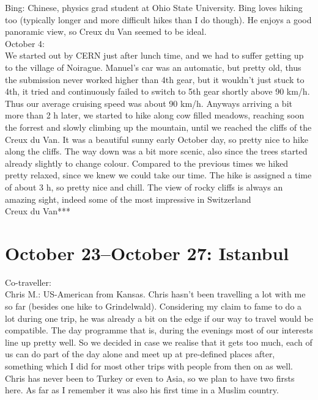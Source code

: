 Bing: Chinese, physics grad student at Ohio State University. Bing loves hiking too (typically longer and more difficult hikes than I do though). He enjoys a good panoramic view, so Creux du Van seemed to be ideal.\\

October 4:\\
We started out by CERN just after lunch time, and we had to suffer getting up to the village of Noirague. Manuel's car was an automatic, but pretty old, thus the submission never worked higher than 4th gear, but it wouldn't just stuck to 4th, it tried and continuously failed to switch to 5th gear shortly above 90 km/h. Thus our average cruising speed was about 90 km/h. Anyways arriving a bit more than 2 h later, we started to hike along cow filled meadows, reaching soon the forrest and slowly climbing up the mountain, until we reached the cliffs of the Creux du Van. It was a beautiful sunny early October day, so pretty nice to hike along the cliffs. The way down was a bit more scenic, also since the trees started already slightly to change colour. Compared to the previous times we hiked pretty relaxed, since we knew we could take our time. The hike is assigned a time of about 3 h, so pretty nice and chill. The view of rocky cliffs is always an amazing sight, indeed some of the most impressive in Switzerland\\

Creux du Van***

\section{October 23--October 27: Istanbul}
\label{Istanbul2014}

Co-traveller:\\
Chris M.: US-American from Kansas. Chris hasn't been travelling a lot with me so far (besides one hike to Grindelwald). Considering my claim to fame to do a lot during one trip, he was already a bit on the edge if our way to travel would be compatible. The day programme that is, during the evenings most of our interests line up pretty well. So we decided in case we realise that it gets too much, each of us can do part of the day alone and meet up at pre-defined places after, something which I did for most other trips with people from then on as well. Chris has never been to Turkey or even to Asia, so we plan to have two firsts here. As far as I remember it was also his first time in a Muslim country.\\

